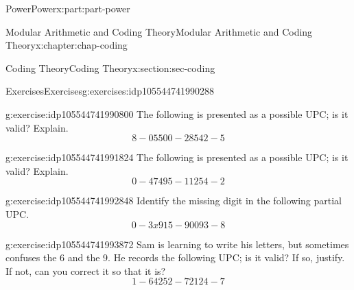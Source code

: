 \documentclass[oneside,10pt,]{book}
\numberwithin{equation}{section}
\begin{document}
\begin{partptx}{Power}{}{Power}{}{}{x:part:part-power}
\begin{chapterptx}{Modular Arithmetic and Coding Theory}{}{Modular Arithmetic and Coding Theory}{}{}{x:chapter:chap-coding}
\begin{sectionptx}{Coding Theory}{}{Coding Theory}{}{}{x:section:sec-coding}
\begin{conclusion}{}
\end{conclusion}%
%
%
\typeout{************************************************}
\typeout{************************************************}
%
\begin{exercises-subsection-numberless}{Exercises}{}{Exercises}{}{}{g:exercises:idp105544741990288}
\begin{divisionexercise}{1}{}{}{g:exercise:idp105544741990800}%
The following is presented as a possible UPC; is it valid? Explain.%
%
\begin{equation*}
8 - 05500 - 28542 -5	
\end{equation*}
\end{divisionexercise}%
\begin{divisionexercise}{2}{}{}{g:exercise:idp105544741991824}%
The following is presented as a possible UPC; is it valid? Explain.%
%
\begin{equation*}
0 - 47495 - 11254 - 2
\end{equation*}
\end{divisionexercise}%
\begin{divisionexercise}{3}{}{}{g:exercise:idp105544741992848}%
Identify the missing digit in the following partial UPC.%
%
\begin{equation*}
0 - 3x915 - 90093 - 8
\end{equation*}
\end{divisionexercise}%
\begin{divisionexercise}{4}{}{}{g:exercise:idp105544741993872}%
Sam is learning to write his letters, but sometimes confuses the 6 and the 9. He records the following UPC; is it valid? If so, justify. If not, can you correct it so that it is?%
%
\begin{equation*}
1 - 64252 - 72124  - 7
\end{equation*}
\end{divisionexercise}%
\end{exercises-subsection-numberless}
\end{sectionptx}
\end{chapterptx}
\end{partptx}
%
%
\typeout{************************************************}
\typeout{************************************************}
%
\end{document}
